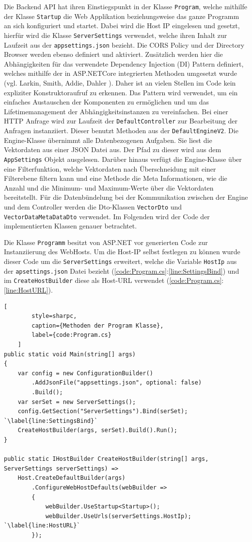 Die Backend API hat ihren Einstiegspunkt in der Klasse \texttt{Program}, welche mithilfe der Klasse \texttt{Startup} die Web Applikation beziehungsweise das ganze Programm an sich konfiguriert und startet. Dabei wird die Host IP eingelesen und gesetzt, hierfür wird die Klasse \texttt{ServerSettings} verwendet, welche ihren Inhalt zur Laufzeit aus der \texttt{appsettings.json} bezieht. Die CORS Policy und der Directory Browser werden ebenso definiert und aktiviert. Zusätzlich werden hier die Abhängigkeiten für das verwendete Dependency Injection (DI) Pattern definiert, welches mithilfe der in ASP.NETCore integrierten Methoden umgesetzt wurde (vgl. Larkin, Smith, Addie, Dahler \cite{Dependen80:online}). Daher ist an vielen Stellen im Code kein expliziter Konstruktoraufruf zu erkennen. Das Pattern wird verwendet, um ein einfaches Austauschen der Komponenten zu ermöglichen und um das Lifetimemanagement der Abhängigkeitsinstanzen zu vereinfachen. Bei einer HTTP Anfrage wird zur Laufzeit der \texttt{DefaultController} zur Bearbeitung der Anfragen instanziiert. Dieser benutzt Methoden aus der \texttt{DefaultEngineV2}. Die Engine-Klasse übernimmt alle Datenbezogenen Aufgaben. Sie liest die Vektordaten aus einer JSON Datei aus. Der Pfad zu dieser wird aus dem \texttt{AppSettings} Objekt ausgelesen. Darüber hinaus verfügt die Engine-Klasse über eine Filterfunktion, welche Vektordaten nach Überschneidung mit einer Filterebene filtern kann und eine Methode die Meta Informationen, wie die Anzahl und die Minimum- und Maximum-Werte über die Vektordaten bereitstellt. Für die Datenbündelung bei der Kommunikation zwischen der Engine und dem Controller werden die Dto-Klassen \texttt{VectorDto} und \texttt{VectorDataMetaDataDto} verwendet. Im Folgenden wird der Code der implementierten Klassen genauer betrachtet.

Die Klasse \texttt{Programm} besitzt von ASP.NET vor generierten Code zur Instanziierung
des WebHosts. Um die Host-IP selbst festlegen zu können wurde dieser
Code um die \texttt{ServerSettings} erweitert, welche die Variable \texttt{HostIp} aus der
\texttt{apsettings.json} Datei bezieht
(\lstlistingname\space \ref{code:Program.cs}:\ref{line:SettingsBind}) und im
\texttt{CreateHostBuilder} diese als Host-URL verwendet
(\lstlistingname\space \ref{code:Program.cs}:\ref{line:HostURL}).

\begin{codeblock}
	\begin{lstlisting}[
		style=sharpc,
		caption={Methoden der Program Klasse},
		label={code:Program.cs}
	]
public static void Main(string[] args)
{
	var config = new ConfigurationBuilder()
		.AddJsonFile("appsettings.json", optional: false)
		.Build();
	var serSet = new ServerSettings();
	config.GetSection("ServerSettings").Bind(serSet); `\label{line:SettingsBind}`
	CreateHostBuilder(args, serSet).Build().Run();
}

public static IHostBuilder CreateHostBuilder(string[] args, ServerSettings serverSettings) =>
	Host.CreateDefaultBuilder(args)
		.ConfigureWebHostDefaults(webBuilder =>
		{
			webBuilder.UseStartup<Startup>();
			webBuilder.UseUrls(serverSettings.HostIp); `\label{line:HostURL}`
		});
	\end{lstlisting}
\end{codeblock}

